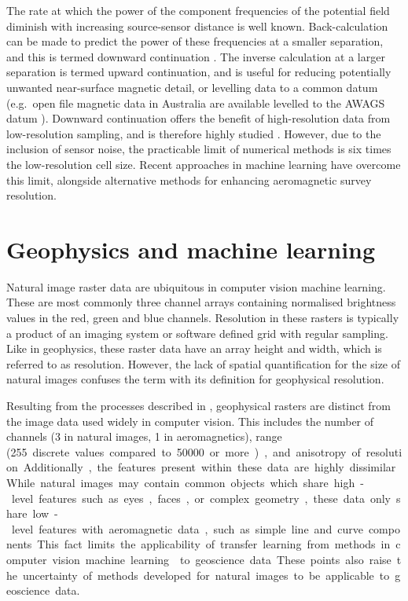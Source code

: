 The rate at which the power of the component frequencies of the potential field diminish with increasing source-sensor distance is well known.
Back-calculation can be made to predict the power of these frequencies at a smaller separation, and this is termed downward continuation \parencite{bullardDeterminationMassesNecessary1948,blakelyPotentialTheoryGravity1996}.
The inverse calculation at a larger separation is termed upward continuation, and is useful for reducing potentially unwanted near-surface magnetic detail, or levelling data to a common datum (e.g.\ open file magnetic data in Australia are available levelled to the AWAGS datum \parencite{mintyAirborneGeophysicalMapping2011}).
Downward continuation offers the benefit of high-resolution data from low-resolution sampling, and is therefore highly studied \parencite{zuoDownwardContinuationTransformation2020,fediStableDownwardContinuation2002,zhangNumericalSolutionsMeanValue2018,guoPotentialFieldContinuation2020,gangImprovedStableDownward2018,pilkingtonPotentialFieldContinuation2017}.
However, due to the inclusion of sensor noise, the practicable limit of numerical methods is six times the low-resolution cell size.
Recent approaches in machine learning have overcome this limit, alongside alternative methods for enhancing aeromagnetic survey resolution.

\section{Geophysics and machine learning}
\label{sec:introdata}
Natural image raster data are ubiquitous in computer vision machine learning.
These are most commonly three channel arrays containing normalised brightness values in the red, green and blue channels.
Resolution in these rasters is typically a product of an imaging system or software defined grid with regular sampling.
Like in geophysics, these raster data have an array height and width, which is referred to as resolution.
However, the lack of spatial quantification for the size of natural images confuses the term with its definition for geophysical resolution.

Resulting from the processes described in , geophysical rasters are distinct from the image data used widely in computer vision.
This includes the number of channels (3 in natural images, 1 in aeromagnetics), range (\qty{255} discrete values compared to \qty{50000} or more), and anisotropy of resolution.
Additionally, the features present within these data are highly dissimilar.
While natural images may contain common objects which share high-level features such as eyes, faces, or complex geometry, these data only share low-level features with aeromagnetic data, such as simple line and curve components.
This fact limits the applicability of transfer learning from methods in computer vision machine learning \parencite{tanSurveyDeepTransfer2018} to geoscience data.
These points also raise the uncertainty of methods developed for natural images to be  applicable to geoscience data.

